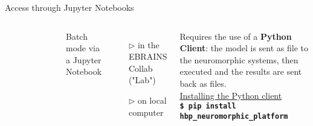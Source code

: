 

\begin{myblock2}{\Large Access through Jupyter Notebooks\phantom{\Huge $\beta$}}
    

	\begin{columns}[t]
			\vskip-8mm
		\begin{figure}[t]
		\end{figure}
		\normalsize
		\vskip4mm
		Batch mode via a Jupyter Notebook\\[-8mm]
		\begin{columns}[t]
		
				\begin{itemize}
					\item[$\rhd$] in the EBRAINS Collab ("Lab")
					\item[$\rhd$] on local computer\\[12mm]
				\end{itemize}
		\end{columns}
		\vskip8mm
		Requires the use of a \textbf{Python Client}: the model is sent as file to the neuromorphic systems, then executed and the results are sent back as files.\\[12pt]
		    
		\underline{Installing the Python client}\\[6mm]
		{
			\fontsize{22}{24}\selectfont
			\texttt{\textbf{\$ pip install hbp\_neuromorphic\_platform}}\\[8mm]
		}
		

\end{columns}
\end{myblock2}
